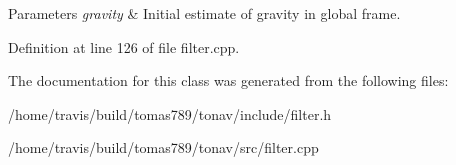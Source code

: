 \begin{DoxyParams}{Parameters}
{\em gravity} & Initial estimate of gravity in global frame. \\
\hline
\end{DoxyParams}


Definition at line 126 of file filter.\-cpp.



The documentation for this class was generated from the following files\-:\begin{DoxyCompactItemize}
\item 
/home/travis/build/tomas789/tonav/include/filter.\-h\item 
/home/travis/build/tomas789/tonav/src/filter.\-cpp\end{DoxyCompactItemize}
